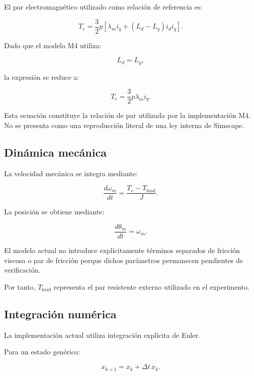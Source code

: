 El par electromagnético utilizado como relación de referencia es:

\begin{equation}
T_e=
\frac{3}{2}p
\left[
\lambda_mi_q+
(L_d-L_q)i_di_q
\right].
\end{equation}

Dado que el modelo M4 utiliza:

\begin{equation}
L_d=L_q,
\end{equation}

la expresión se reduce a:

\begin{equation}
T_e=
\frac{3}{2}p\lambda_mi_q.
\end{equation}

Esta ecuación constituye la relación de par utilizada por la implementación M4. No se presenta como una reproducción literal de una ley interna de Simscape.

\subsection{Dinámica mecánica}

La velocidad mecánica se integra mediante:

\begin{equation}
\frac{d\omega_m}{dt}
=
\frac{T_e-T_{\mathrm{load}}}{J}.
\end{equation}

La posición se obtiene mediante:

\begin{equation}
\frac{d\theta_m}{dt}
=
\omega_m.
\end{equation}

El modelo actual no introduce explícitamente términos separados de fricción viscosa o par de fricción porque dichos parámetros permanecen pendientes de verificación.

Por tanto, $T_{\mathrm{load}}$ representa el par resistente externo utilizado en el experimento.

\subsection{Integración numérica}

La implementación actual utiliza integración explícita de Euler.

Para un estado genérico:

\begin{equation}
x_{k+1}
=
x_k+\Delta t\,\dot{x}_k.
\end{equation}

